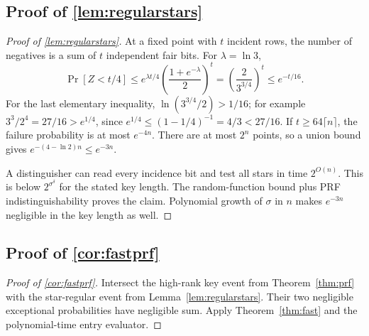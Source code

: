 \subsection[Proof of result regularstars]{Proof of \cref{lem:regularstars}}\label{proof:regularstars}
\begin{proof}[Proof of \cref{lem:regularstars}]
At a fixed point with $t$ incident rows, the number of negatives is a sum of $t$ independent fair bits. For $\lambda=\ln3$,
\[
 \Pr[Z<t/4]\le e^{\lambda t/4}\left(\frac{1+e^{-\lambda}}2\right)^t
 =\left(\frac{2}{3^{3/4}}\right)^t\le e^{-t/16}.
\]
For the last elementary inequality, $\ln(3^{3/4}/2)>1/16$; for example $3^3/2^4=27/16>e^{1/4}$, since $e^{1/4}\le(1-1/4)^{-1}=4/3<27/16$. If $t\ge64\lceil n\rceil$, the failure probability is at most $e^{-4n}$. There are at most $2^n$ points, so a union bound gives $e^{-(4-\ln2)n}\le e^{-3n}$.

A distinguisher can read every incidence bit and test all stars in time $2^{O(n)}$. This is below $2^{\sigma^\delta}$ for the stated key length. The random-function bound plus PRF indistinguishability proves the claim. Polynomial growth of $\sigma$ in $n$ makes $e^{-3n}$ negligible in the key length as well.
\end{proof}

\subsection[Proof of result fastprf]{Proof of \cref{cor:fastprf}}\label{proof:fastprf}
\begin{proof}[Proof of \cref{cor:fastprf}]
Intersect the high-rank key event from Theorem~\ref{thm:prf} with the star-regular event from Lemma~\ref{lem:regularstars}. Their two negligible exceptional probabilities have negligible sum. Apply Theorem~\ref{thm:fast} and the polynomial-time entry evaluator.
\end{proof}

